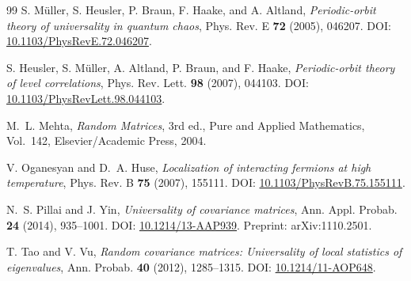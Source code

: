 \documentclass[11pt]{amsart}
\numberwithin{equation}{section}
\theoremstyle{plain}
\theoremstyle{definition}
\theoremstyle{remark}
\begin{document}
\begin{thebibliography}{99}
S. M\"uller, S. Heusler, P. Braun, F. Haake, and A. Altland,
\emph{Periodic-orbit theory of universality in quantum chaos},
Phys. Rev. E \textbf{72} (2005), 046207.
DOI: \href{https://doi.org/10.1103/PhysRevE.72.046207}{10.1103/PhysRevE.72.046207}.

S. Heusler, S. M\"uller, A. Altland, P. Braun, and F. Haake,
\emph{Periodic-orbit theory of level correlations},
Phys. Rev. Lett. \textbf{98} (2007), 044103.
DOI: \href{https://doi.org/10.1103/PhysRevLett.98.044103}{10.1103/PhysRevLett.98.044103}.

M.~L. Mehta,
\emph{Random Matrices}, 3rd ed.,
Pure and Applied Mathematics, Vol.~142,
Elsevier/Academic Press, 2004.

V. Oganesyan and D.~A. Huse,
\emph{Localization of interacting fermions at high temperature},
Phys. Rev. B \textbf{75} (2007), 155111.
DOI: \href{https://doi.org/10.1103/PhysRevB.75.155111}{10.1103/PhysRevB.75.155111}.

N.~S. Pillai and J. Yin,
\emph{Universality of covariance matrices},
Ann. Appl. Probab. \textbf{24} (2014), 935--1001.
DOI: \href{https://doi.org/10.1214/13-AAP939}{10.1214/13-AAP939}.
Preprint: arXiv:1110.2501.

T. Tao and V. Vu,
\emph{Random covariance matrices: Universality of local statistics of eigenvalues},
Ann. Probab. \textbf{40} (2012), 1285--1315.
DOI: \href{https://doi.org/10.1214/11-AOP648}{10.1214/11-AOP648}.

\end{thebibliography}
\end{document}
